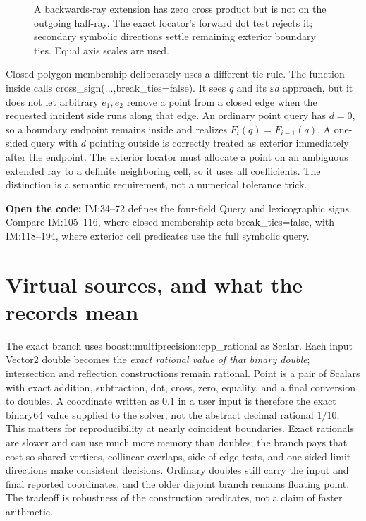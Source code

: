 \documentclass[12pt,a4paper]{article}
\newcommand{\code}[1]{{\ttfamily\color{codekw}#1}}
\begin{document}
\begin{figure}[h]\centering\figbackwards\caption{A backwards-ray extension has zero cross product but is not on the outgoing half-ray. The exact locator's forward dot test rejects it; secondary symbolic directions settle remaining exterior boundary ties. Equal axis scales are used.}\label{fig:backwards}\end{figure}

Closed-polygon membership deliberately uses a different tie rule. The function \code{inside} calls \code{cross\_sign(...,break\_ties=false)}. It sees \(q\) and its \(\varepsilon d\) approach, but it does not let arbitrary \(e_1,e_2\) remove a point from a closed edge when the requested incident side runs along that edge. An ordinary point query has \(d=0\), so a boundary endpoint remains inside and realizes \(F_i(q)=F_{i-1}(q)\). A one-sided query with \(d\) pointing outside is correctly treated as exterior immediately after the endpoint. The exterior locator must allocate a point on an ambiguous extended ray to a definite neighboring cell, so it uses all coefficients. The distinction is a semantic requirement, not a numerical tolerance trick.
\begin{sourcebox}
\textbf{Open the code:} \code{IM:34--72} defines the four-field Query and lexicographic signs. Compare \code{IM:105--116}, where closed membership sets \code{break\_ties=false}, with \code{IM:118--194}, where exterior cell predicates use the full symbolic query.
\end{sourcebox}

\section{Virtual sources, and what the records mean}
The exact branch uses \code{boost::multiprecision::cpp\_rational} as \code{Scalar}. Each input \code{Vector2} double becomes the \emph{exact rational value of that binary double}; intersection and reflection constructions remain rational. \code{Point} is a pair of Scalars with exact addition, subtraction, dot, cross, zero, equality, and a final conversion to doubles. A coordinate written as \(0.1\) in a user input is therefore the exact binary64 value supplied to the solver, not the abstract decimal rational \(1/10\). This matters for reproducibility at nearly coincident boundaries. Exact rationals are slower and can use much more memory than doubles; the branch pays that cost so shared vertices, collinear overlaps, side-of-edge tests, and one-sided limit directions make consistent decisions. Ordinary doubles still carry the input and final reported coordinates, and the older disjoint branch remains floating point. The tradeoff is robustness of the construction predicates, not a claim of faster arithmetic.
\end{document}
